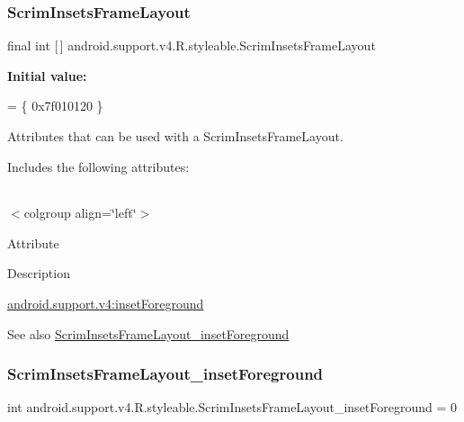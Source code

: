 \subsubsection{\texorpdfstring{Scrim\+Insets\+Frame\+Layout}{ScrimInsetsFrameLayout}}
{\footnotesize\ttfamily final int \mbox{[}$\,$\mbox{]} android.\+support.\+v4.\+R.\+styleable.\+Scrim\+Insets\+Frame\+Layout\hspace{0.3cm}{\ttfamily [static]}}

{\bfseries Initial value\+:}
\begin{DoxyCode}
= \{
            0x7f010120
        \}
\end{DoxyCode}
Attributes that can be used with a Scrim\+Insets\+Frame\+Layout. 

Includes the following attributes\+:

\tabulinesep=1mm
\begin{longtabu} spread 0pt [c]{*{0}{|X[-1]}|}
\hline
\end{longtabu}
$<$colgroup align=\char`\"{}left\char`\"{}$>$ 

Attribute

Description 

{\ttfamily \hyperlink{classandroid_1_1support_1_1v4_1_1R_1_1styleable_a9d6928d3605fb3a5348e3c0b8738c6bc}{android.\+support.\+v4\+:inset\+Foreground}}

\begin{DoxySeeAlso}{See also}
\hyperlink{classandroid_1_1support_1_1v4_1_1R_1_1styleable_a9d6928d3605fb3a5348e3c0b8738c6bc}{Scrim\+Insets\+Frame\+Layout\+\_\+inset\+Foreground} 
\end{DoxySeeAlso}
\mbox{\label{classandroid_1_1support_1_1v4_1_1R_1_1styleable_a9d6928d3605fb3a5348e3c0b8738c6bc}} 
\subsubsection{\texorpdfstring{Scrim\+Insets\+Frame\+Layout\+\_\+inset\+Foreground}{ScrimInsetsFrameLayout\_insetForeground}}
{\footnotesize\ttfamily int android.\+support.\+v4.\+R.\+styleable.\+Scrim\+Insets\+Frame\+Layout\+\_\+inset\+Foreground = 0\hspace{0.3cm}{\ttfamily [static]}}

